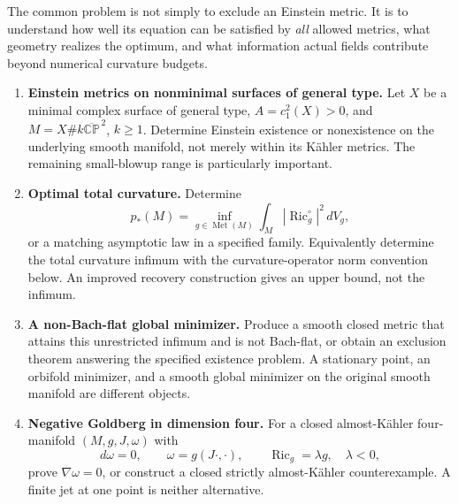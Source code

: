 \documentclass[11pt]{article}
\newcommand{\Ric}{\operatorname{Ric}}
\newcommand{\CP}{\mathbb{CP}}
\theoremstyle{remark}
\begin{document}
The common problem is not simply to exclude an Einstein metric. It is to
understand how well its equation can be satisfied by \emph{all} allowed
metrics, what geometry realizes the optimum, and what information actual
fields contribute beyond numerical curvature budgets.

\begin{enumerate}[label=\textbf{Q\arabic*.}]
\item \textbf{Einstein metrics on nonminimal surfaces of general type.}
Let $X$ be a minimal complex surface of general type, $A=c_1^2(X)>0$, and
$M=X\# k\overline{\CP}^{\,2}$, $k\ge1$. Determine Einstein existence or
nonexistence on the underlying smooth manifold, not merely within its
K\"ahler metrics. The remaining small-blowup range is particularly important.
\item \textbf{Optimal total curvature.} Determine
\[
 p_*(M)=\inf_{g\in\operatorname{Met}(M)}
 \int_M|\Ric_g^\circ|^2\,dV_g,
\]
or a matching asymptotic law in a specified family. Equivalently determine the
total curvature infimum with the curvature-operator norm convention below.
An improved recovery construction gives an upper bound, not the infimum.
\item \textbf{A non-Bach-flat global minimizer.} Produce a smooth closed
metric that attains this unrestricted infimum and is not Bach-flat, or obtain
an exclusion theorem answering the specified existence problem. A stationary
point, an orbifold minimizer, and a smooth global minimizer on the original
smooth manifold are different objects.
\item \textbf{Negative Goldberg in dimension four.} For a closed
almost-K\"ahler four-manifold $(M,g,J,\omega)$ with
\[
 d\omega=0,\qquad \omega=g(J\cdot,\cdot),\qquad
 \Ric_g=\lambda g,\quad\lambda<0,
\]
prove $\nabla\omega=0$, or construct a closed strictly almost-K\"ahler
counterexample. A finite jet at one point is neither alternative.
\end{enumerate}
\end{document}
